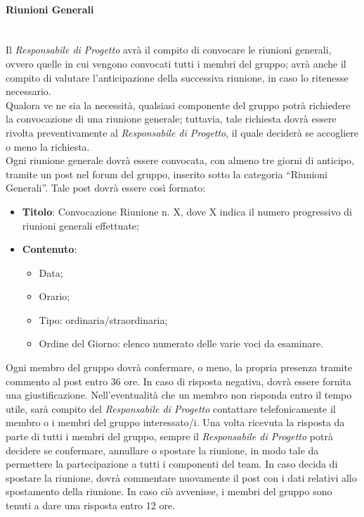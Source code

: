 \paragraph{Riunioni Generali}\mbox{}\\
Il \textit{Responsabile di Progetto} avrà il compito di convocare le riunioni generali, ovvero quelle in cui vengono convocati tutti i membri del gruppo; avrà anche il compito di valutare l'anticipazione della successiva riunione, in caso lo ritenesse necessario. \\
Qualora ve ne sia la necessità, qualsiasi componente del gruppo potrà richiedere la convocazione di una riunione generale; tuttavia, tale richiesta dovrà essere rivolta preventivamente al \textit{Responsabile di Progetto}, il quale deciderà se accogliere o meno la richiesta. \\
Ogni riunione generale dovrà essere convocata, con almeno tre giorni di anticipo, tramite un post nel forum del gruppo, inserito sotto la categoria “Riunioni Generali”.
Tale post dovrà essere così formato:
\begin{itemize}
\item \textbf{Titolo}: Convocazione Riunione n. X, dove X indica il numero progressivo di riunioni generali effettuate;
\item \textbf{Contenuto}: 
\begin{itemize}
\item Data;
\item Orario;
\item Tipo: ordinaria/straordinaria;
\item Ordine del Giorno: elenco numerato delle varie voci da esaminare.
\end{itemize}
\end{itemize}
Ogni membro del gruppo dovrà confermare, o meno, la propria presenza tramite commento al post entro 36 ore. In caso di risposta negativa, dovrà essere fornita una giustificazione. Nell'eventualità che un membro non risponda entro il tempo utile, sarà compito del \textit{Responsabile di Progetto} contattare telefonicamente il membro o i membri del gruppo interessato/i. Una volta ricevuta la risposta da parte di tutti i membri del gruppo, sempre il \textit{Responsabile di Progetto} potrà decidere se confermare, annullare o spostare la riunione, in modo tale da permettere la partecipazione a tutti i componenti del team. In caso decida di spostare la riunione, dovrà commentare nuovamente il post con i dati relativi allo spostamento della riunione. In caso ciò avvenisse, i membri del gruppo sono tenuti a dare una risposta entro 12 ore.

